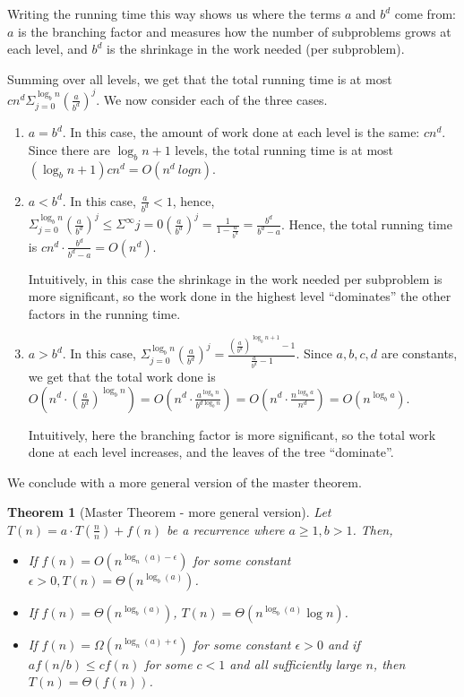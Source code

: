 \documentclass [12pt]{article}
\newtheorem{theorem}{Theorem}
\begin{document}
Writing the running time this way shows us where the terms $a$ and $b^d$
come from: $a$ is the branching factor and measures how the number of subproblems grows at each level, and $b^d$ is the shrinkage in the work needed (per subproblem).

Summing over all levels, we get that the total running time is at most $cn^d\Sigma_{j=0}^{\log_b n}\left(\frac{a}{b^d}\right)^j$. We now consider each of the three cases.

\begin{enumerate}
    \item $a = b^d$. In this case, the amount of work done at each level is the same: $cn^d$. Since there are $\log_b n+1$ levels, the total running time is at most $(\log_b n+1)cn^d = O(n^d\ log n)$.
    \item $a < b^d$. In this case, $\frac{a}{b^d} < 1$, hence, $\Sigma^{\log_b n}_{j=0} \left(\frac{a}{b^d}\right)^j \leq \Sigma^{\infty}{j=0} \left(\frac{a}{b^d}\right)^j = \frac{1}{1-\frac{a}{b^d}}= \frac{b^d}{b^d-a}$. Hence, the total running time is $cn^d \cdot \frac{b^d}{b^d-a} = O(n^d)$.

    Intuitively, in this case the shrinkage in the work needed per subproblem is more significant, so the work done in the highest level ``dominates'' the other factors in the running time.
    \item $a > b^d$. In this case, $\Sigma^{\log_b n}_{j=0} \left(\frac{a}{b^d}\right)^j = \frac{\left(\frac{a}{b^d}\right)^{\log_bn+1}-1}{\frac{a}{b^d} -1}$. Since $a, b, c, d$ are constants, we get that the total work done is $O\left(n^d\cdot(\frac{a}{b^d})^{\log_b n}\right) = O\left(n^d\cdot \frac{a^{\log_b n}}{b^{d \log_b n}}\right) = O\left(n^d \cdot \frac{n^{\log_b a }}{n^d}\right)=O\left(n^{\log_b a}\right)$.

    Intuitively, here the branching factor is more significant, so the total work done at each level increases, and the leaves of the tree ``dominate''.
\end{enumerate}

We conclude with a more general version of the master theorem.

\begin{theorem}[Master Theorem - more general version]
Let $T(n) = a \cdot T(\frac{n}{n}) + f(n)$ be a recurrence where $a \geq 1, b > 1$. Then, 
    \begin{itemize}
        \item If $f(n) = O(n^{\log_n(a) - \epsilon})$ for some constant $\epsilon > 0, T(n) = \Theta(n^{\log_b (a)})$.
        \item If $f(n) = \Theta(n^{\log_b(a)})$, $T(n) = \Theta(n^{\log_b (a)} \log n)$.
        \item If $f(n) = \Omega(n^{\log_n(a) + \epsilon})$ for some constant $\epsilon > 0$ and if $af(n/b) \leq cf(n)$ for some $c < 1$ and all sufficiently large $n$, then $T(n) = \Theta(f(n))$.
    \end{itemize}
\end{theorem}
\end{document}
